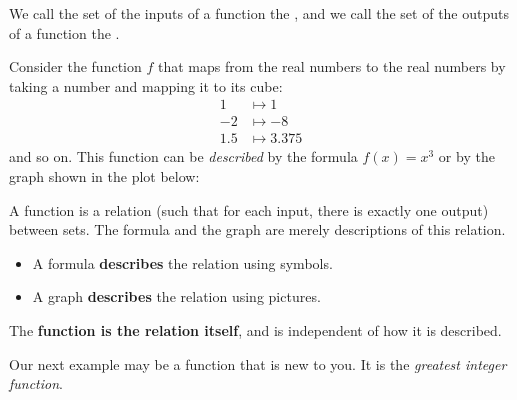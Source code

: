 \documentclass{ximera}
\begin{document}
\begin{definition}
  We call the set of the inputs of a function the
  , and we call the set of the outputs of a
  function the .
\end{definition}

\begin{example}
Consider the function $f$ that maps from the real numbers to the real
numbers by taking a number and mapping it to its cube:
\begin{align*}
1 &\mapsto 1\\
-2 &\mapsto -8\\
1.5 &\mapsto 3.375
\end{align*}
and so on. This function can be \textit{described} by the formula
$f(x)=x^3$ or by the graph shown in the plot below:
\begin{image}
\end{image}
\end{example}

\begin{warning}
A function is a relation (such that for each input, there is exactly
one output) between sets. The formula and the graph are merely
descriptions of this relation.
\begin{itemize}
\item A formula \textbf{describes} the relation using symbols.
\item A graph \textbf{describes} the relation using pictures. 
\end{itemize}
The \textbf{function is the relation itself}, and is independent of how
it is described.
\end{warning}

Our next example may be a function that is new to you. It is the
\textit{greatest integer function}.
\end{document}
